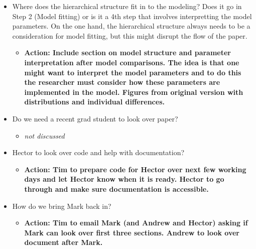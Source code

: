 \documentclass[]{article}
\providecommand{\tightlist}{%
  \setlength{\itemsep}{0pt}\setlength{\parskip}{0pt}}
\begin{document}
\begin{itemize}
\item
  Where does the hierarchical structure fit in to the modeling? Does it
  go in Step 2 (Model fitting) or is it a 4th step that involves
  interpretting the model parameters. On the one hand, the hierarchical
  structure always needs to be a consideration for model fitting, but
  this might disrupt the flow of the paper.

  \begin{itemize}
  \tightlist
  \item
    \textbf{Action: Include section on model structure and parameter
    interpretation after model comparisons. The idea is that one might
    want to interpret the model parameters and to do this the researcher
    must consider how these parameters are implemented in the model.
    Figures from original version with distributions and individual
    differences.}
  \end{itemize}
\item
  Do we need a recent grad student to look over paper?

  \begin{itemize}
  \tightlist
  \item
    \emph{not discussed}
  \end{itemize}
\item
  Hector to look over code and help with documentation?

  \begin{itemize}
  \tightlist
  \item
    \textbf{Action: Tim to prepare code for Hector over next few working
    days and let Hector know when it is ready. Hector to go through and
    make sure documentation is accessible.}
  \end{itemize}
\item
  How do we bring Mark back in?

  \begin{itemize}
  \tightlist
  \item
    \textbf{Action: Tim to email Mark (and Andrew and Hector) asking if
    Mark can look over first three sections. Andrew to look over
    document after Mark.}
  \end{itemize}
\end{itemize}
\end{document}

